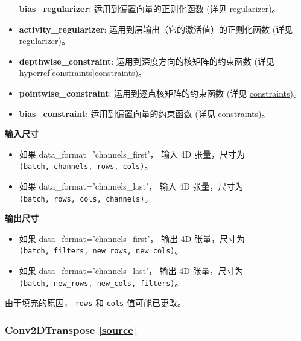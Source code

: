 \begin{itemize}
  \textbf{bias\_regularizer}: 运用到偏置向量的正则化函数 (详见
  \hyperref[regularizers]{regularizer})。
\item
  \textbf{activity\_regularizer}: 运用到层输出（它的激活值）的正则化函数
  (详见 \hyperref[regularizers]{regularizer})。
\item
  \textbf{depthwise\_constraint}: 运用到深度方向的核矩阵的约束函数 (详见
  \\hyperref[constraints]{constraints})。
\item
  \textbf{pointwise\_constraint}: 运用到逐点核矩阵的约束函数 (详见
  \hyperref[constraints]{constraints})。
\item
  \textbf{bias\_constraint}: 运用到偏置向量的约束函数 (详见
  \hyperref[constraints]{constraints})。
\end{itemize}

\textbf{输入尺寸}

\begin{itemize}
\tightlist
\item
  如果 data\_format='channels\_first'， 输入 4D 张量，尺寸为
  \texttt{(batch,\ channels,\ rows,\ cols)}。
\item
  如果 data\_format='channels\_last'， 输入 4D 张量，尺寸为
  \texttt{(batch,\ rows,\ cols,\ channels)}。
\end{itemize}

\textbf{输出尺寸}

\begin{itemize}
\tightlist
\item
  如果 data\_format='channels\_first'， 输出 4D 张量，尺寸为
  \texttt{(batch,\ filters,\ new\_rows,\ new\_cols)}。
\item
  如果 data\_format='channels\_last'， 输出 4D 张量，尺寸为
  \texttt{(batch,\ new\_rows,\ new\_cols,\ filters)}。
\end{itemize}

由于填充的原因， \texttt{rows} 和 \texttt{cols} 值可能已更改。




\subsubsection{Conv2DTranspose {\href{https://github.com/keras-team/keras/blob/master/keras/layers/convolutional.py\#L596}{{[}source{]}}}}

